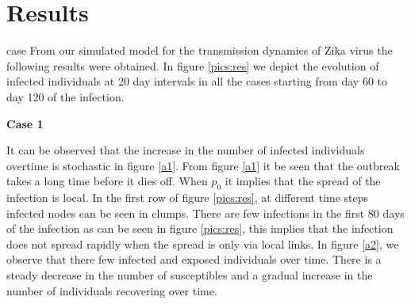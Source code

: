 \newpage
\section{Results}
case
From our simulated model for the transmission dynamics of Zika virus the following results were obtained. In figure \ref{pics:res} we depict the evolution of infected individuals at 20 day intervals in all the cases starting from day 60 to day 120 of the infection.

\textbf{Case 1}

It can be observed that the increase in the number of infected individuals overtime is stochastic in figure \ref{a1}.  From figure \ref{a1} it be seen that the outbreak takes a long time before it dies off. When $p_0$ it implies that the spread of the infection is local. In the first row  of figure \ref{pics:res}, at different time steps infected nodes can be seen in clumps. There are few infections in the first 80 days of the infection as can be seen  in figure \ref{pics:res}, this implies that the infection does not spread rapidly when the spread is only via local links. In figure \ref{a2}, we observe that there few infected and exposed individuals over time. There is a steady decrease in the number of susceptibles and a gradual increase in the number of individuals recovering over time.

